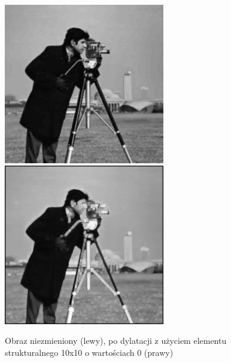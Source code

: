 \documentclass[a4paper,12pt]{book}
\begin{document}
\begin{figure}[H]
	\caption{Obraz niezmieniony (lewy), po dylatacji z użyciem elementu strukturalnego 10x10 o wartościach 0 (prawy)}
	\includegraphics[width=7cm, height=7cm]{man-unmodified.jpg}
	\includegraphics[width=7cm, height=7cm]{morph-gray-dilation-strel10x10-0.png}
\end{figure}
\end{document}
